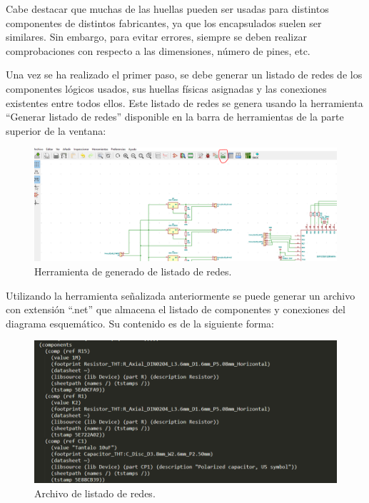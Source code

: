 Cabe destacar que muchas de las huellas pueden ser usadas para distintos componentes de distintos fabricantes, ya que los encapsulados suelen ser similares. Sin embargo, para evitar errores, siempre se deben realizar comprobaciones con respecto a las dimensiones, número de pines, etc.

Una vez se ha realizado el primer paso, se debe generar un listado de redes de los componentes lógicos usados, sus huellas físicas asignadas y las conexiones existentes entre todos ellos. Este listado de redes se genera usando la herramienta ``Generar listado de redes'' disponible en la barra de herramientas de la parte superior de la ventana:

\begin{figure}[H]
\centering 
\includegraphics[width=0.9\linewidth]{pictures/GenerarRed.PNG}
\caption{Herramienta de generado de listado de redes.}
\label{fig:CAMBIAR!!!!!!!!!!}
\end{figure}

Utilizando la herramienta señalizada anteriormente se puede generar un archivo con extensión ``.net'' que almacena el listado de componentes y conexiones del diagrama esquemático. Su contenido es de la siguiente forma:

\begin{figure}[H]
\centering 
\includegraphics[width=0.9\linewidth]{pictures/net.PNG}
\caption{Archivo de listado de redes.}
\label{fig:CAMBIAR!!!!!!!!!!}
\end{figure}

